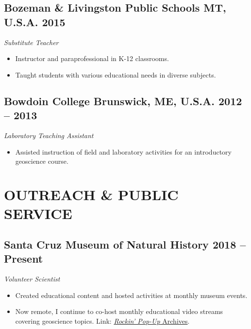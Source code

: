 \documentclass[10pt]{article}
\begin{document}
\subsection*{\textbf{Bozeman \& Livingston Public Schools} \hspace{15pt} MT, U.S.A. \hfill 2015}
\textit{Substitute Teacher}
\begin{itemize}
	\item Instructor and paraprofessional in K-12 classrooms.
	\item Taught students with various educational needs in diverse subjects.
\end{itemize}

\subsection*{\textbf{Bowdoin College} \hspace{15pt} Brunswick, ME, U.S.A. \hfill 2012 – 2013}
\textit{Laboratory Teaching Assistant}
\begin{itemize}
	\item Assisted instruction of field and laboratory activities for an introductory geoscience course.
\end{itemize}


\section*{OUTREACH \& PUBLIC SERVICE}

\subsection*{\textbf{Santa Cruz Museum of Natural History} \hfill 2018 – Present}
\textit{Volunteer Scientist}
\begin{itemize}
	\item Created educational content and hosted activities at monthly museum events.
	\item Now remote, I continue to co-host monthly educational video streams covering geoscience topics. Link: \href{https://www.santacruzmuseum.org/category/rockin-pop-up/}{\emph{Rockin' Pop-Up} Archives}.
\end{itemize}
\end{document}
